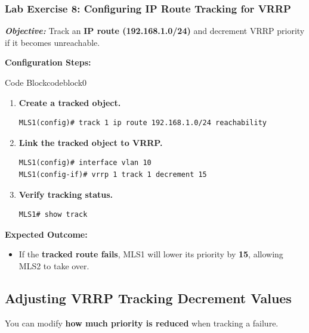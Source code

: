 \documentclass[a4paper]{book}
\begin{document}
\subsubsection{Lab Exercise 8: Configuring IP Route Tracking for VRRP}
\textbf{\textit{Objective:}} Track an \textbf{IP route (192.168.1.0/24)} and decrement VRRP 
priority if it becomes unreachable.
\vspace{1.5em}

\textbf{Configuration Steps:}

\vspace{1.5em}


\begin{ocg}{Code Block}{codeblock}{0}

\vspace{0.5cm}
\begin{enumerate}
\item \textbf{Create a tracked object.}
\begin{lstlisting}
MLS1(config)# track 1 ip route 192.168.1.0/24 reachability
\end{lstlisting}

\item \textbf{Link the tracked object to VRRP.}
\begin{lstlisting}
MLS1(config)# interface vlan 10
MLS1(config-if)# vrrp 1 track 1 decrement 15
\end{lstlisting}

\item \textbf{Verify tracking status.}
\begin{lstlisting}
MLS1# show track
\end{lstlisting}
\end{enumerate}
\end{ocg}




\textbf{Expected Outcome:}
\begin{itemize}
\item If the \textbf{tracked route fails}, MLS1 will lower its priority by \textbf{15}, 
allowing MLS2 to take over.
\end{itemize}

\subsection{Adjusting VRRP Tracking Decrement Values}
You can modify \textbf{how much priority is reduced} when tracking a failure.
\end{document}

